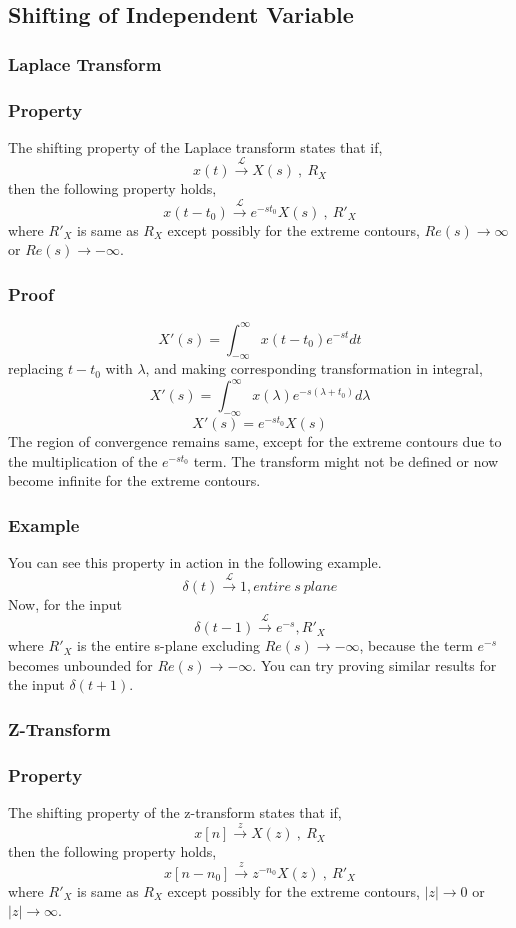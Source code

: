 \subsection{Shifting of Independent Variable}
\subsubsection{Laplace Transform}
\subsubsection{Property}
The shifting property of the Laplace transform states that if,
\[
x(t) \xrightarrow{\ \mathcal{L}\ } X(s)\ ,\ R_{X}
\]
then the following property holds,
\[
x(t - t_0) \xrightarrow{\ \mathcal{L}\ } e^{-st_0}X(s)\ ,\ {R'}_{X} 
\]
where ${R'}_X$ is same as $R_X$ except possibly for the extreme contours, $Re(s) \rightarrow \infty$ or $Re(s) \rightarrow -\infty$.
\subsubsection{Proof}
\[
X'(s) = \int_{-\infty}^{\infty}{x(t-t_0)e^{-st}dt}
\]
replacing $t-t_0$ with $\lambda$, and making corresponding transformation in integral,
\[
X'(s) = \int_{-\infty}^{\infty}{x(\lambda)e^{-s(\lambda + t_0)}d\lambda}
\]
\[
X'(s) = e^{-st_0}X(s)
\]
The region of convergence remains same, except for the extreme contours due to the multiplication of the $e^{-st_0}$ term. The transform might not be defined or now become infinite for the extreme contours.
\subsubsection{Example}
You can see this property in action in the following example.
\[\delta(t) \xrightarrow{\ \mathcal{L}\ } 1 , entire\ s\ plane
\]
Now, for the input 
\[
\delta(t-1) \xrightarrow{\ \mathcal{L}\ } e^{-s} , {R'}_X
\]
where ${R'}_X$ is the entire s-plane excluding $Re(s) \rightarrow -\infty$, because the term $e^{-s}$ becomes unbounded for $Re(s) \rightarrow - \infty$. You can try proving similar results for the input $\delta(t+1)$.
\subsubsection{Z-Transform}
\subsubsection{Property}
The shifting property of the z-transform states that if,
\[
x[n] \xrightarrow{\ z\ } X(z)\ ,\ R_{X}
\]
then the following property holds,
\[
x[n - n_0] \xrightarrow{\ z\ }z^{-n_0}X(z)\ ,\ {R'}_{X}
\]
where ${R'}_X$ is same as $R_X$ except possibly for the extreme contours, $|z| \rightarrow 0$ or $|z| \rightarrow \infty$.
